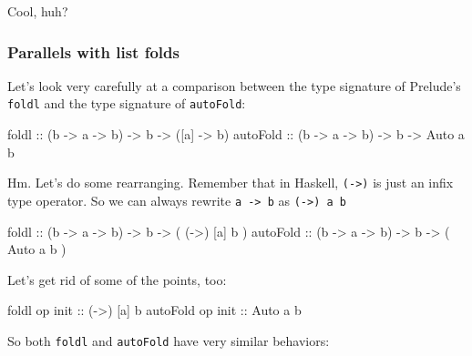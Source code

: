 \documentclass[]{article}
\newenvironment{Shaded}{}{}
\newcommand{\DataTypeTok}[1]{\textcolor[rgb]{0.56,0.13,0.00}{{#1}}}
\newcommand{\OtherTok}[1]{\textcolor[rgb]{0.00,0.44,0.13}{{#1}}}
\newcommand{\NormalTok}[1]{{#1}}
\begin{document}
Cool, huh?

\subsubsection{Parallels with list folds}\label{parallels-with-list-folds}

Let's look very carefully at a comparison between the type signature of Prelude's \texttt{foldl} and
the type signature of \texttt{autoFold}:

\begin{Shaded}
\begin{Highlighting}[]
\NormalTok{foldl}\OtherTok{      ::} \NormalTok{(b }\OtherTok{->} \NormalTok{a }\OtherTok{->} \NormalTok{b) }\OtherTok{->} \NormalTok{b }\OtherTok{->} \NormalTok{([a] }\OtherTok{->} \NormalTok{b)}
\OtherTok{autoFold   ::} \NormalTok{(b }\OtherTok{->} \NormalTok{a }\OtherTok{->} \NormalTok{b) }\OtherTok{->} \NormalTok{b }\OtherTok{->}  \DataTypeTok{Auto} \NormalTok{a b}
\end{Highlighting}
\end{Shaded}

Hm. Let's do some rearranging. Remember that in Haskell, \texttt{(-\textgreater{})} is just an infix
type operator. So we can always rewrite \texttt{a\ -\textgreater{}\ b} as
\texttt{(-\textgreater{})\ a\ b}

\begin{Shaded}
\begin{Highlighting}[]
\NormalTok{foldl}\OtherTok{      ::} \NormalTok{(b }\OtherTok{->} \NormalTok{a }\OtherTok{->} \NormalTok{b) }\OtherTok{->} \NormalTok{b }\OtherTok{->} \NormalTok{( (}\OtherTok{->}\NormalTok{) [a] b )}
\OtherTok{autoFold   ::} \NormalTok{(b }\OtherTok{->} \NormalTok{a }\OtherTok{->} \NormalTok{b) }\OtherTok{->} \NormalTok{b }\OtherTok{->} \NormalTok{( }\DataTypeTok{Auto}  \NormalTok{a  b )}
\end{Highlighting}
\end{Shaded}

Let's get rid of some of the points, too:

\begin{Shaded}
\begin{Highlighting}[]
\NormalTok{foldl    op}\OtherTok{ init  ::} \NormalTok{(}\OtherTok{->}\NormalTok{) [a] b}
\NormalTok{autoFold op}\OtherTok{ init  ::} \DataTypeTok{Auto}  \NormalTok{a  b}
\end{Highlighting}
\end{Shaded}

So both \texttt{foldl} and \texttt{autoFold} have very similar behaviors:
\end{document}
